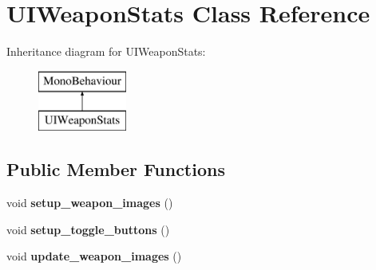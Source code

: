 \hypertarget{class_u_i_weapon_stats}{}\section{U\+I\+Weapon\+Stats Class Reference}
\label{class_u_i_weapon_stats}
Inheritance diagram for U\+I\+Weapon\+Stats\+:\begin{figure}[H]
\begin{center}
\leavevmode
\includegraphics[height=2.000000cm]{class_u_i_weapon_stats}
\end{center}
\end{figure}
\subsection*{Public Member Functions}
\begin{DoxyCompactItemize}
\item 
\mbox{\label{class_u_i_weapon_stats_ac61be979d6f09c23add101bcce744e16}} 
void {\bfseries setup\+\_\+weapon\+\_\+images} ()
\item 
\mbox{\label{class_u_i_weapon_stats_a0b8b84ccb467658320cefa435b2b648a}} 
void {\bfseries setup\+\_\+toggle\+\_\+buttons} ()
\item 
\mbox{\label{class_u_i_weapon_stats_a47ea9e5781e6a384094f7915931b485a}} 
void {\bfseries update\+\_\+weapon\+\_\+images} ()
\end{DoxyCompactItemize}
